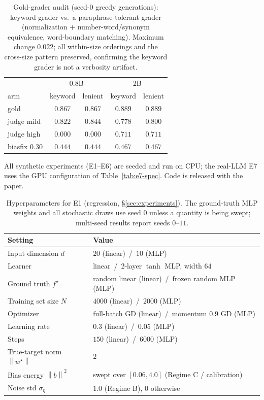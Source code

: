 \documentclass[10pt]{article} %
\theoremstyle{plain}
\theoremstyle{remark}
\newcommand{\fstar}{f^{\star}}
\newcommand{\norm}[1]{\left\lVert #1 \right\rVert}
\begin{document}
\begin{table}[h]
\centering\small
\caption{Gold-grader audit (seed-0 greedy generations): keyword grader vs.\ a paraphrase-tolerant grader (normalization $+$ number-word/synonym equivalence, word-boundary matching). Maximum change $0.022$; all within-size orderings and the cross-size pattern preserved, confirming the keyword grader is not a verbosity artifact.}
\label{tab:e7-grader}
\begin{tabular}{lcccc}
\hline
 & \multicolumn{2}{c}{0.8B} & \multicolumn{2}{c}{2B} \\
arm & keyword & lenient & keyword & lenient \\
\hline
gold & $0.867$ & $0.867$ & $0.889$ & $0.889$ \\
judge mild & $0.822$ & $0.844$ & $0.778$ & $0.800$ \\
judge high & $0.000$ & $0.000$ & $0.711$ & $0.711$ \\
biasfix $0.30$ & $0.444$ & $0.444$ & $0.467$ & $0.467$ \\
\hline
\end{tabular}
\end{table}
\label{app:details}
All synthetic experiments (E1--E6) are seeded and run on CPU; the real-LLM E7 uses the GPU configuration of Table~\ref{tab:e7-spec}. Code is released with the paper.

\begin{table}[h]
\caption{Hyperparameters for E1 (regression, \S\ref{sec:experiments}). The ground-truth MLP weights and all stochastic draws use seed $0$ unless a quantity is being swept; multi-seed results report seeds $0\text{--}11$.}
\label{tab:e1}
\begin{center}
\begin{tabular}{ll}
\hline
Setting & Value \\
\hline
Input dimension $d$ & $20$ (linear) \,/\, $10$ (MLP) \\
Learner & linear \,/\, 2-layer $\tanh$ MLP, width $64$ \\
Ground truth $\fstar$ & random linear (linear) \,/\, frozen random MLP (MLP) \\
Training set size $N$ & $4000$ (linear) \,/\, $2000$ (MLP) \\
Optimizer & full-batch GD (linear) \,/\, momentum $0.9$ GD (MLP) \\
Learning rate & $0.3$ (linear) \,/\, $0.05$ (MLP) \\
Steps & $150$ (linear) \,/\, $6000$ (MLP) \\
True-target norm $\norm{w^\star}$ & $2$ \\
Bias energy $\norm{b}^2$ & swept over $[0.06, 4.0]$ (Regime C / calibration) \\
Noise std $\sigma_\eta$ & $1.0$ (Regime B), $0$ otherwise \\
\hline
\end{tabular}
\end{center}
\end{table}
\end{document}
